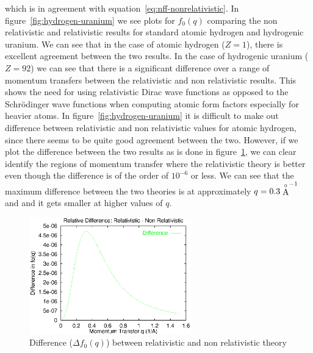     which is in agreement with equation~\ref{eq:nff-nonrelativistic}.
    In figure~\ref{fig:hydrogen-uranium} we see plots for $f_0(q)$ comparing the non relativistic
    and relativistic results for standard atomic hydrogen and hydrogenic
    uranium.
    We can see that in the case of atomic hydrogen ($Z=1$), there is
    excellent agreement between the two results.
    In the case of hydrogenic uranium ($Z=92$) we can see that there is a
    significant difference over a range of momentum transfers between the
    relativistic and non relativistic results. 
    This shows the need for using relativistic Dirac wave functions as opposed to
    the Schr\"odinger wave functions when computing atomic form factors
    especially for heavier atoms.
    In figure~\ref{fig:hydrogen-uranium} it is difficult to make out difference
    between relativistic and non relativistic values for atomic hydrogen, since
    there seems to be quite good agreement between the two. However, if we plot
    the difference between the two results as is done in
    figure~\ref{fig:delta-theory}, we can clear identify the regions of momentum
    transfer where the relativistic theory is better even though the difference
    is of the order of $10^{-6}$ or less. We can see that the maximum
    difference between the two theories is at approximately $q = 0.3 \stackrel{\circ}{\mathrm{A}}^{-1}$ and
    and it gets smaller at higher values of $q$.
    \begin{figure}[h]
    \begin{center}
        \includegraphics[width=7.0cm]{delta_theory.eps}
        \caption{Difference ($\Delta f_0(q)$) between relativistic and non relativistic theory}
        \label{fig:delta-theory}
    \end{center}
    \end{figure}

